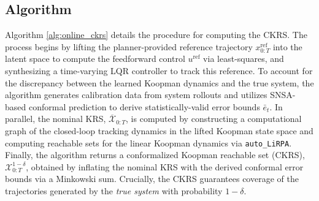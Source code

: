\documentclass{l4dc2026}
\begin{document}
\subsection{Algorithm}\label{app:algorithm}

Algorithm \ref{alg:online_ckrs} details the procedure for computing the CKRS. The process begins by lifting the planner-provided reference trajectory $x_{0:T}^\textrm{ref}$ into the latent space to compute the feedforward control $u^\textrm{ref}$ via least-squares, and synthesizing a time-varying LQR controller to track this reference. To account for the discrepancy between the learned Koopman dynamics and the true system, the algorithm generates calibration data from system rollouts and utilizes SNSA-based conformal prediction to derive statistically-valid error bounds $\bar e_t$. In parallel, the nominal KRS, $\overline{\mathcal{X}}_{0:T}$, is computed by constructing a computational graph of the closed-loop tracking dynamics in the lifted Koopman state space and computing reachable sets for the linear Koopman dynamics via \texttt{auto\_LiRPA}. Finally, the algorithm returns a conformalized Koopman reachable set (CKRS), $\mathcal{X}_{0:T}^{1-\delta}$, obtained by inflating the nominal KRS with the derived conformal error bounds via a Minkowski sum. Crucially, the CKRS guarantees coverage of the trajectories generated by the \textit{true system} with probability $1-\delta$.
\end{document}
